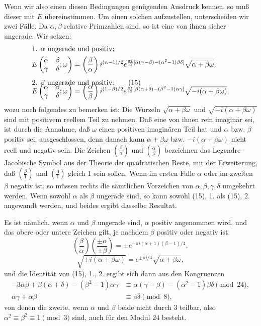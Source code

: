 \documentclass[11pt]{article}
\newcommand{\Jac}[2]{\left(\frac{#1}{#2}\right)}
\begin{document}
Wenn wir also einen diesen Bedingungen genügenden Ausdruck kennen, so muß dieser mit $E$ übereinstimmen. Um einen solchen aufzustellen, unterscheiden wir zwei Fälle. Da $\alpha,\beta$ relative Primzahlen sind, so ist eine von ihnen sicher ungerade. Wir setzen:
\begin{align}
&\text{1. }\alpha\text{ ungerade und positiv:}
\notag\\
&E\left(\begin{matrix}\alpha&\beta\\\gamma&\delta\end{matrix};\omega\right)
=\Jac{\beta}{\alpha} i^{(\alpha-1)/2}
 e^{{\pi i\over12}[\alpha(\gamma-\beta)-(\alpha^2-1)\beta\delta]}
 \sqrt{\alpha+\beta\omega},
\notag\\[0.4em]
&\text{2. }\beta\text{ ungerade und positiv:}
\tag{15}\\[-1.0em]
&E\left(\begin{matrix}\alpha&\beta\\\gamma&\delta\end{matrix};\omega\right)
=\Jac{\alpha}{\beta} i^{(1-\beta)/2}
 e^{{\pi i\over12}[\beta(\alpha+\delta)-(\beta^2-1)\alpha\gamma]}
 \sqrt{-i(\alpha+\beta\omega)}.
\notag
\end{align}
wozu noch folgendes zu bemerken ist: Die Wurzeln $\sqrt{\alpha+\beta\omega}$ und $\sqrt{-i(\alpha+\beta\omega)}$ sind mit positivem reellem Teil zu nehmen. Daß eine von ihnen rein imaginär sei, ist durch die Annahme, daß $\omega$ einen positiven imaginären Teil hat und $\alpha$ bzw. $\beta$ positiv sei, ausgeschlossen, denn danach kann $\alpha+\beta\omega$ bzw. $-i(\alpha+\beta\omega)$ nicht reell und negativ sein. Die Zeichen $\Jac{\beta}{\alpha}$ und $\Jac{\alpha}{\beta}$ bezeichnen das Legendre-Jacobische Symbol aus der Theorie der quadratischen Reste, mit der Erweiterung, daß $\Jac{\beta}{1}$ und $\Jac{0}{1}$ gleich $1$ sein sollen. Wenn im ersten Falle $\alpha$ oder im zweiten $\beta$ negativ ist, so müssen rechts die sämtlichen Vorzeichen von $\alpha,\beta,\gamma,\delta$ umgekehrt werden. Wenn sowohl $\alpha$ als $\beta$ ungerade sind, so kann sowohl (15), 1. als (15), 2. angewandt werden, und beides ergibt dasselbe Resultat.

Es ist nämlich, wenn $\alpha$ und $\beta$ ungerade sind, $\alpha$ positiv angenommen wird, und das obere oder untere Zeichen gilt, je nachdem $\beta$ positiv oder negativ ist:
\[
\Jac{\beta}{\alpha}\Jac{\pm\alpha}{\pm\beta}
=\pm e^{-\pi i(\alpha+1)(\beta-1)/4},
\]
\[
\sqrt{\pm i(\alpha+\beta\omega)}=e^{\pm\pi i/4}\sqrt{\alpha+\beta\omega},
\]
und die Identität von (15), 1., 2. ergibt sich dann aus den Kongruenzen
\begin{align*}
-3\alpha\beta+\beta(\alpha+\delta)-(\beta^2-1)\alpha\gamma
&\equiv \alpha(\gamma-\beta)-(\alpha^2-1)\beta\delta \pmod{24},\\
\alpha\gamma+\alpha\beta&\equiv \beta\delta \pmod8,
\end{align*}
von denen die zweite, wenn $\alpha$ und $\beta$ beide nicht durch $3$ teilbar, also $\alpha^2\equiv\beta^2\equiv1\pmod3$ sind, auch für den Modul $24$ besteht.
\end{document}
